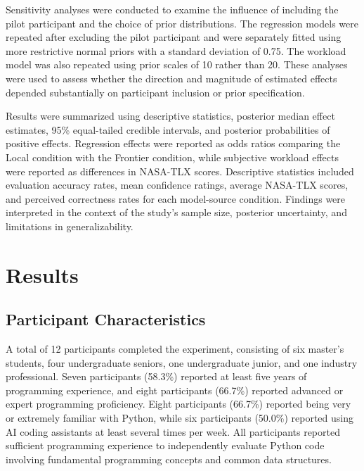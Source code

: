 \documentclass[manuscript,review]{acmart}
\begin{document}
Sensitivity analyses were conducted to examine the influence of including the pilot participant and the choice of prior distributions. The regression models were repeated after excluding the pilot participant and were separately fitted using more restrictive normal priors with a standard deviation of 0.75. The workload model was also repeated using prior scales of 10 rather than 20. These analyses were used to assess whether the direction and magnitude of estimated effects depended substantially on participant inclusion or prior specification.

Results were summarized using descriptive statistics, posterior median effect estimates, 95\% equal-tailed credible intervals, and posterior probabilities of positive effects. Regression effects were reported as odds ratios comparing the Local condition with the Frontier condition, while subjective workload effects were reported as differences in NASA-TLX scores. Descriptive statistics included evaluation accuracy rates, mean confidence ratings, average NASA-TLX scores, and perceived correctness rates for each model-source condition. Findings were interpreted in the context of the study's sample size, posterior uncertainty, and limitations in generalizability.


\section{Results}

\subsection{Participant Characteristics}
A total of 12 participants completed the experiment, consisting of six master's students, four undergraduate seniors, one undergraduate junior, and one industry professional. Seven participants (58.3\%) reported at least five years of programming experience, and eight participants (66.7\%) reported advanced or expert programming proficiency. Eight participants (66.7\%) reported being very or extremely familiar with Python, while six participants (50.0\%) reported using AI coding assistants at least several times per week. All participants reported sufficient programming experience to independently evaluate Python code involving fundamental programming concepts and common data structures.
\end{document}
